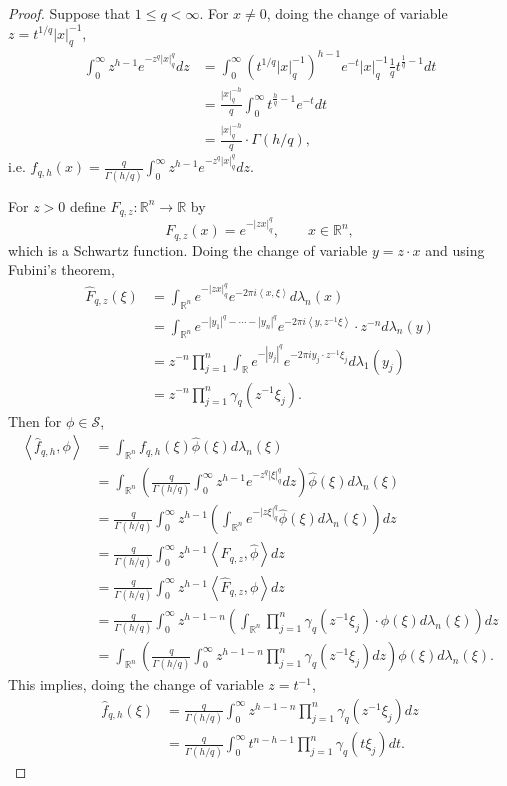 \documentclass{article}
\newcommand{\inner}[2]{\left\langle #1, #2 \right\rangle}
\theoremstyle{definition}
\begin{document}
\begin{proof}
Suppose that $1 \leq q < \infty$. 
For $x \neq 0$, doing the change of variable $z=t^{1/q} |x|_q^{-1}$,
\begin{align*}
\int_0^\infty z^{h-1} e^{-z^q |x|_q^q} dz&=\int_0^\infty (t^{1/q} |x|_q^{-1})^{h-1} e^{-t} |x|_q^{-1} \frac{1}{q} t^{\frac{1}{q}-1} dt\\
&=\frac{|x|_q^{-h}}{q} \int_0^\infty t^{\frac{h}{q}-1} e^{-t} dt\\
&=\frac{|x|_q^{-h}}{q} \cdot \Gamma(h/q),
\end{align*}
i.e. $f_{q,h}(x) = \frac{q}{\Gamma(h/q)} \int_0^\infty z^{h-1} e^{-z^q |x|_q^q} dz$.

For  $z>0$ define $F_{q,z}:\mathbb{R}^n \to \mathbb{R}$ by
\[
F_{q,z}(x) = e^{-|zx|_q^q},\qquad x \in \mathbb{R}^n,
\]
which is a Schwartz function. Doing the change of variable
$y=z\cdot x$ and using Fubini's theorem,
\begin{align*}
\widehat{F}_{q,z}(\xi)&=\int_{\mathbb{R}^n} e^{-|zx|_q^q} e^{-2\pi i\inner{x}{\xi}} d\lambda_n(x)\\
&=\int_{\mathbb{R}^n} e^{-|y_1|^q-\cdots-|y_n|^q} e^{-2\pi i\inner{y}{z^{-1}\xi}} \cdot z^{-n} d\lambda_n(y)\\
&=z^{-n} \prod_{j=1}^n \int_{\mathbb{R}} e^{-|y_j|^q} e^{-2\pi iy_j \cdot z^{-1} \xi_j} d\lambda_1(y_j)\\
&=z^{-n} \prod_{j=1}^n \gamma_q(z^{-1}\xi_j).
\end{align*}
Then for $\phi \in \mathscr{S}$,
\begin{align*}
\inner{\widehat{f}_{q,h}}{\phi}&=\int_{\mathbb{R}^n} f_{q,h}(\xi) \widehat{\phi}(\xi) d\lambda_n(\xi)\\
&=\int_{\mathbb{R}^n} \left( \frac{q}{\Gamma(h/q)} \int_0^\infty z^{h-1} e^{-z^q |\xi|_q^q} dz\right)  \widehat{\phi}(\xi) d\lambda_n(\xi)\\
&=\frac{q}{\Gamma(h/q)} \int_0^\infty z^{h-1} \left( \int_{\mathbb{R}^n} e^{-|z\xi|_q^q}  \widehat{\phi}(\xi) d\lambda_n(\xi) \right) dz\\
&=\frac{q}{\Gamma(h/q)} \int_0^\infty z^{h-1} \inner{F_{q,z}}{\widehat{\phi}} dz\\
&=\frac{q}{\Gamma(h/q)} \int_0^\infty z^{h-1} \inner{\widehat{F}_{q,z}}{\phi} dz\\
&=\frac{q}{\Gamma(h/q)} \int_0^\infty z^{h-1-n} \left(\int_{\mathbb{R}^n} \prod_{j=1}^n \gamma_q(z^{-1}\xi_j) \cdot \phi(\xi) d\lambda_n(\xi)\right)
dz\\
&= \int_{\mathbb{R}^n} \left(\frac{q}{\Gamma(h/q)}\int_0^\infty z^{h-1-n} \prod_{j=1}^n \gamma_q(z^{-1}\xi_j) dz\right) \phi(\xi) d\lambda_n(\xi).
\end{align*}
This implies, doing the change of variable $z=t^{-1}$,
\begin{align*}
\widehat{f}_{q,h}(\xi)&=\frac{q}{\Gamma(h/q)}\int_0^\infty z^{h-1-n} \prod_{j=1}^n \gamma_q(z^{-1}\xi_j) dz\\
&=\frac{q}{\Gamma(h/q)}\int_0^\infty t^{n-h-1} \prod_{j=1}^n \gamma_q(t\xi_j) dt.
\end{align*}
\end{proof}
\end{document}
